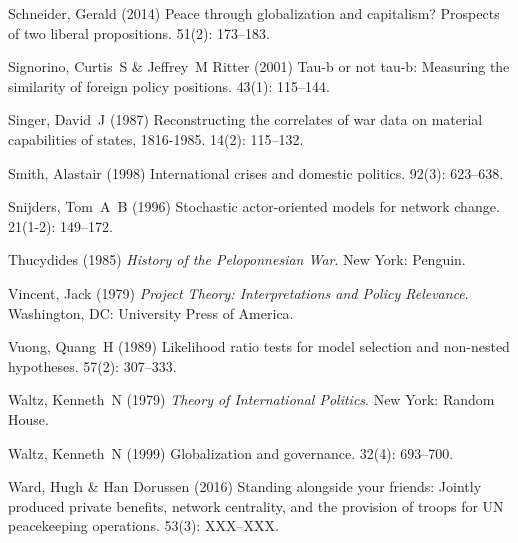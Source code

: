 \documentclass[12pt]{article}
\theoremstyle{hypothesis}
\begin{document}
\begin{thebibliography}{}
Schneider, Gerald (2014) Peace through globalization and capitalism? Prospects
  of two liberal propositions.
 { 51\/}(2): 173--183.

Signorino, Curtis~S  \& Jeffrey~M Ritter (2001) Tau-b or not tau-b: Measuring
  the similarity of foreign policy positions.
 { 43\/}(1): 115--144.

Singer, David~J (1987) Reconstructing the correlates of war data on material
  capabilities of states, 1816-1985.
 { 14\/}(2): 115--132.

Smith, Alastair (1998) International crises and domestic politics.
 { 92\/}(3): 623--638.

Snijders, Tom~A~B (1996) Stochastic actor-oriented models for network change.
 { 21\/}(1-2): 149--172.

Thucydides (1985) {\em History of the Peloponnesian War}.
\newblock New York: Penguin.

Vincent, Jack (1979) {\em Project Theory: Interpretations and Policy
  Relevance}.
\newblock Washington, DC: University Press of America.

Vuong, Quang~H (1989) Likelihood ratio tests for model selection and non-nested
  hypotheses.
 { 57\/}(2): 307--333.

Waltz, Kenneth~N (1979) {\em Theory of International Politics}.
\newblock New York: Random House.

Waltz, Kenneth~N (1999) Globalization and governance.
 { 32\/}(4): 693--700.

Ward, Hugh \& Han Dorussen (2016) Standing alongside your friends: Jointly produced private benefits, network centrality, and the provision of troops for UN peacekeeping operations. 
 { 53\/}(3): XXX--XXX.


\end{thebibliography}
\end{document}
